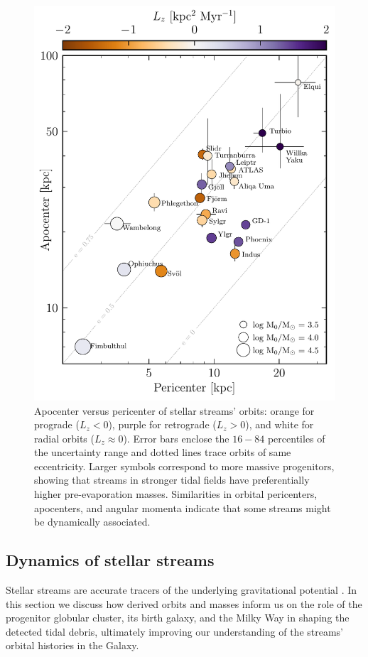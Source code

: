 \documentclass[twocolumn]{aastex63}
\begin{document}
\begin{figure}
\includegraphics[width=\hsize]{streams_peri_apo.pdf}
\caption{
Apocenter versus pericenter of stellar streams' orbits:
orange for prograde ($L_z<0$), purple for retrograde ($L_z>0$), and white for radial orbits ($L_z\approx0$).
Error bars enclose the $16-84$ percentiles of the uncertainty range and dotted lines trace orbits of same eccentricity.
Larger symbols correspond to more massive progenitors, showing that streams in stronger tidal fields have preferentially higher pre-evaporation masses.
Similarities in orbital pericenters, apocenters, and angular momenta indicate that some streams might be dynamically associated.
}
\label{fig:individual_summary}
\end{figure}


\subsection{Dynamics of stellar streams}
\label{sec:discuss_dynamics}
Stellar streams are accurate tracers of the underlying gravitational potential \citep{bh:2018}.
In this section we discuss how derived orbits and masses inform us on the role of the progenitor globular cluster, its birth galaxy, and the Milky Way in shaping the detected tidal debris, ultimately improving our understanding of the streams' orbital histories in the Galaxy.
\end{document}
